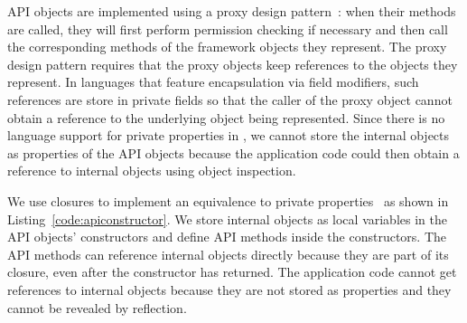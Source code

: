 API objects are implemented using a proxy design pattern~\cite{gamma1994design}:  
when their methods are
called, they will first perform permission checking if necessary and then call
the corresponding methods of the framework objects they represent. The proxy
design pattern requires that the proxy objects keep references to the objects they
represent. In languages that feature encapsulation via field modifiers, such 
references are store in private fields so
that the caller of the proxy object cannot obtain a reference to the 
underlying object being represented. Since there is no language support for private
properties in \js, we cannot  store the internal objects as properties of the
API objects because the application code could then obtain a reference to internal
objects using object inspection. 


We use closures to implement an equivalence to private properties~\cite{jsprivate} as
shown in Listing~\ref{code:apiconstructor}. We store internal objects as local
variables in the API objects' constructors and define API methods inside the
constructors. The API methods can reference internal objects
directly because they are part of its closure, even after the constructor has returned.
The application code cannot get references to internal objects because they 
are not stored as properties and they cannot be revealed by reflection.




